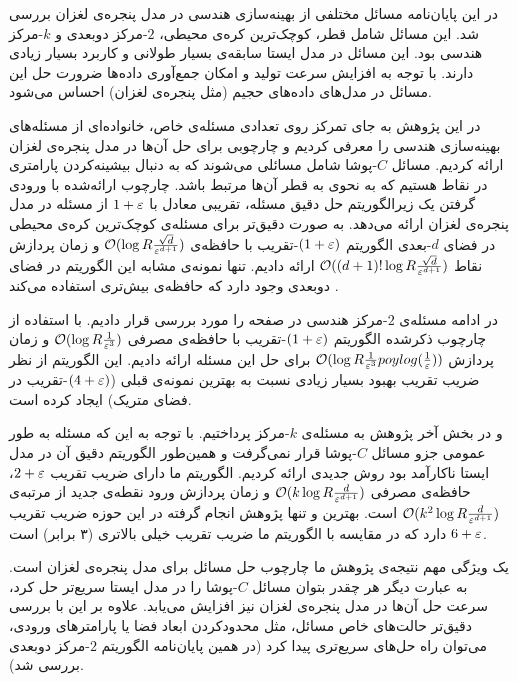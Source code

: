 

در این پایان‌نامه مسائل مختلفی از بهینه‌سازی هندسی در مدل پنجره‌ی لغزان بررسی شد. این مسائل شامل قطر، کوچک‌ترین کره‌ی محیطی، $2$-مرکز دوبعدی و $k$-مرکز هندسی بود. این مسائل در مدل ایستا سابقه‌‌ی بسیار طولانی و کاربرد بسیار زیادی دارند. با توجه به افزایش سرعت تولید و امکان جمع‌آوری داده‌ها ضرورت حل این مسائل در مدل‌های داده‌های حجیم (مثل پنجره‌ی لغزان) احساس می‌شود. 

در این پژوهش به جای تمرکز روی تعدادی مسئله‌ی خاص، خانواده‌ای از مسئله‌های بهینه‌سازی هندسی را معرفی کردیم و چارچوبی برای حل آن‌ها در مدل پنجره‌ی لغزان ارائه کردیم. مسائل $C$-پوشا شامل مسائلی می‌شوند که به دنبال بیشینه‌کردن پارامتری در نقاط هستیم که به نحوی به قطر آن‌ها مرتبط باشد. چارچوب ارائه‌شده با ورودی گرفتن یک زیرالگوریتم حل دقیق مسئله، تقریبی معادل با $1+\varepsilon$ از مسئله در مدل پنجره‌ی لغزان ارائه می‌دهد. به صورت دقیق‌تر برای مسئله‌ی کوچک‌ترین کره‌ی محیطی در فضای $d$-بعدی الگوریتم $(1+\varepsilon)$-تقریب با حافظه‌ی $ \mathcal{O}(\log R \frac{\sqrt{d}}{\varepsilon^{d+1}})$ و زمان پردازش نقاط  $ \mathcal{O}((d+1)! \log R \frac{\sqrt{d}}{\varepsilon^{d+1}})$ ارائه دادیم. تنها نمونه‌ی مشابه این الگوریتم در فضای دوبعدی وجود دارد که حافظه‌ی بیش‌تری استفاده می‌کند .

در ادامه مسئله‌ی $2$-مرکز هندسی در صفحه را مورد بررسی قرار دادیم. با استفاده از چارچوب ذکرشده الگوریتم $(1+\varepsilon)$-تقریب با حافظه‌ی مصرفی $ \mathcal{O}(\log R \frac{1}{\varepsilon^{3}})$ و زمان پردازش $ \mathcal{O}(\log R \frac{1}{\varepsilon^3} poylog(\frac{1}{\varepsilon}))$ برای حل این مسئله ارائه دادیم. این الگوریتم از نظر ضریب تقریب بهبود بسیار زیادی نسبت به بهترین نمونه‌ی قبلی ($(4+\varepsilon)$-تقریب در فضای متریک) ایجاد کرده است.

و در بخش آخر پژوهش به مسئله‌ی $k$-مرکز پرداختیم. با توجه به این که مسئله به طور عمومی جزو مسائل $C$-پوشا قرار نمی‌گرفت و همین‌طور الگوریتم دقیق آن در مدل ایستا ناکارآمد بود روش جدیدی ارائه کردیم. الگوریتم ما دارای ضریب تقریب $2+\varepsilon$، حافظه‌ی مصرفی $ \mathcal{O}(k \log R \frac{d}{\varepsilon^{d+1}})$ و زمان پردازش ورود نقطه‌ی جدید از مرتبه‌ی $ \mathcal{O}(k^2 \log R \frac{d}{\varepsilon^{d+1}})$ است. بهترین و تنها پژوهش انجام گرفته در این حوزه ضریب تقریب $6+\varepsilon$ دارد که در مقایسه با الگوریتم ما ضریب تقریب خیلی بالاتری (۳ برابر) است. 


یک ویژگی مهم نتیجه‌ی پژوهش ما چارچوب حل مسائل برای مدل پنجره‌ی لغزان است. به عبارت دیگر هر چقدر بتوان مسائل $C$-پوشا را در مدل ایستا سریع‌تر حل کرد، سرعت حل آن‌ها در مدل پنجره‌ی لغزان نیز افزایش می‌یابد. علاوه بر این با بررسی دقیق‌تر حالت‌های خاص مسائل، مثل محدودکردن ابعاد فضا یا پارامترهای ورودی،  می‌توان راه حل‌های سریع‌تری پیدا کرد (در همین پایان‌نامه الگوریتم $2$-مرکز دوبعدی بررسی شد).

